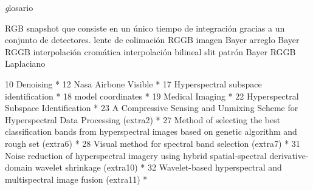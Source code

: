 \textit

glosario

RGB
snapshot
que consiste en un único tiempo de integración gracias a un conjunto de detectores. 
lente de colimación
RGGB
imagen Bayer
arreglo Bayer RGGB
interpolación cromática
interpolación bilineal
slit
patrón Bayer RGGB
Laplaciano


10 Denoising *
12 Nasa Airbone Visible *
17 Hyperspectral subspace identification *
18 model coordinates *
19 Medical Imaging *
22 Hyperspectral Subspace Identification * 
23 A Compressive Sensing and Unmixing Scheme for Hyperspectral Data Processing (extra2) *
27 Method of selecting the best classification bands from hyperspectral images based on genetic algorithm and rough set (extra6) *
28 Visual method for spectral band selection (extra7) *
31 Noise reduction of hyperspectral imagery using hybrid spatial-spectral derivative-domain wavelet shrinkage (extra10) *
32 Wavelet-based hyperspectral and multispectral image fusion (extra11) *
